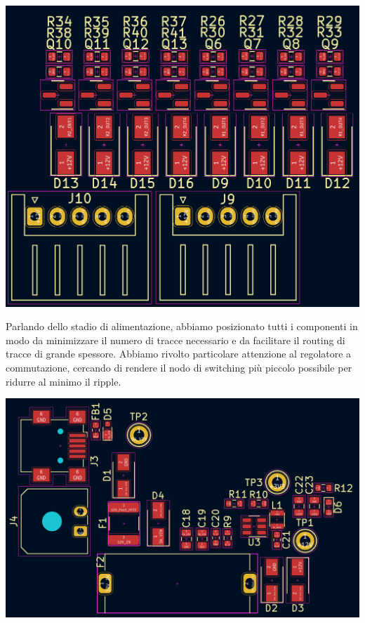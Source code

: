 \begin{center}
\includegraphics[scale=0.3]{figures/image55.png}
\captionsetup{type=figure}
\end{center}

Parlando dello stadio di alimentazione, abbiamo posizionato tutti i
componenti in modo da minimizzare il numero di tracce necessario e da
facilitare il routing di tracce di grande spessore. Abbiamo rivolto
particolare attenzione al regolatore a commutazione, cercando di rendere
il nodo di switching più piccolo possibile per ridurre al minimo il
ripple.

\begin{center}
\includegraphics[scale=0.25]{figures/image56.png}
\captionsetup{type=figure}
\end{center}

